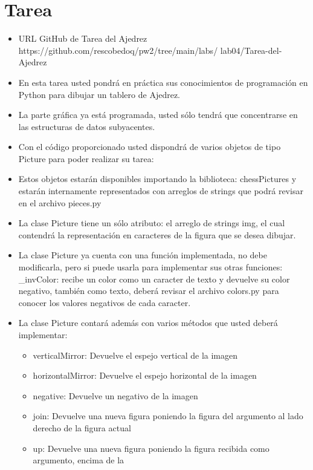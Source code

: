 \documentclass{article}
\begin{document}
\tableofcontents
\pagebreak


\section{Tarea}
\begin{itemize}
	\item URL GitHub de Tarea del Ajedrez https://github.com/rescobedoq/pw2/tree/main/labs/
	      lab04/Tarea-del-Ajedrez
	\item En esta tarea usted pondrá en práctica sus conocimientos de programación en Python para
	      dibujar un tablero de Ajedrez.
	\item La parte gráfica ya está programada, usted sólo tendrá que concentrarse en las estructuras de
	      datos subyacentes.
	\item Con el código proporcionado usted dispondrá de varios objetos de tipo Picture para poder realizar
	      su tarea:
	\item Estos objetos estarán disponibles importando la biblioteca: chessPictures y estarán internamente representados con arreglos de strings que podrá revisar en el archivo pieces.py
	\item La clase Picture tiene un sólo atributo: el arreglo de strings img, el cual contendrá la representación en caracteres de la figura que se desea dibujar.
	\item La clase Picture ya cuenta con una función implementada, no debe modificarla, pero si puede
	      usarla para implementar sus otras funciones: \_invColor: recibe un color como un caracter de texto y devuelve su color negativo, también
	      como texto, deberá revisar el archivo colors.py para conocer los valores negativos de cada
	      caracter.
	\item La clase Picture contará además con varios métodos que usted deberá implementar:
	      \begin{itemize}
		      \item verticalMirror: Devuelve el espejo vertical de la imagen
		      \item horizontalMirror: Devuelve el espejo horizontal de la imagen
		      \item negative: Devuelve un negativo de la imagen
		      \item join: Devuelve una nueva figura poniendo la figura del argumento al lado derecho de la
		            figura actual
		      \item up: Devuelve una nueva figura poniendo la figura recibida como argumento, encima de la

\end{itemize}
\end{itemize}
\end{document}
